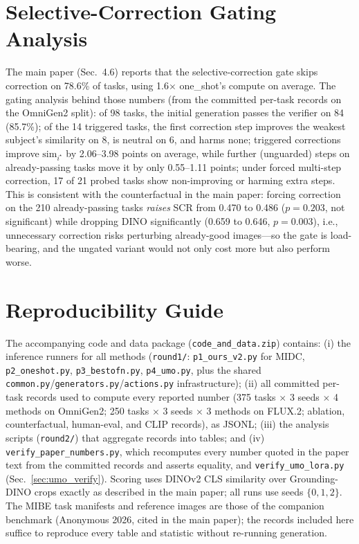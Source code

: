 \documentclass[letterpaper]{article}
\begin{document}
\section{Selective-Correction Gating Analysis}
\label{sec:gating}

The main paper (Sec.~4.6) reports that the selective-correction gate skips correction on 78.6\% of tasks, using 1.6$\times$ one\_shot's compute on average. The gating analysis behind those numbers (from the committed per-task records on the OmniGen2 split): of 98 tasks, the initial generation passes the verifier on 84 (85.7\%); of the 14 triggered tasks, the first correction step improves the weakest subject's similarity on 8, is neutral on 6, and harms none; triggered corrections improve $\mathrm{sim}_{i^\star}$ by 2.06--3.98 points on average, while further (unguarded) steps on already-passing tasks move it by only 0.55--1.11 points; under forced multi-step correction, 17 of 21 probed tasks show non-improving or harming extra steps. This is consistent with the counterfactual in the main paper: forcing correction on the 210 already-passing tasks \emph{raises} SCR from 0.470 to 0.486 ($p{=}0.203$, not significant) while dropping DINO significantly (0.659 to 0.646, $p{=}0.003$), i.e., unnecessary correction risks perturbing already-good images---so the gate is load-bearing, and the ungated variant would not only cost more but also perform worse.

\section{Reproducibility Guide}
\label{sec:repro}

The accompanying code and data package (\texttt{code\_and\_data.zip}) contains: (i) the inference runners for all methods (\texttt{round1/}: \texttt{p1\_ours\_v2.py} for MIDC, \texttt{p2\_oneshot.py}, \texttt{p3\_bestofn.py}, \texttt{p4\_umo.py}, plus the shared \texttt{common.py}/\texttt{generators.py}/\texttt{actions.py} infrastructure); (ii) all committed per-task records used to compute every reported number (375 tasks $\times$ 3 seeds $\times$ 4 methods on OmniGen2; 250 tasks $\times$ 3 seeds $\times$ 3 methods on FLUX.2; ablation, counterfactual, human-eval, and CLIP records), as JSONL; (iii) the analysis scripts (\texttt{round2/}) that aggregate records into tables; and (iv) \texttt{verify\_paper\_numbers.py}, which recomputes every number quoted in the paper text from the committed records and asserts equality, and \texttt{verify\_umo\_lora.py} (Sec.~\ref{sec:umo_verify}). Scoring uses DINOv2 CLS similarity over Grounding-DINO crops exactly as described in the main paper; all runs use seeds $\{0, 1, 2\}$. The MIBE task manifests and reference images are those of the companion benchmark (Anonymous 2026, cited in the main paper); the records included here suffice to reproduce every table and statistic without re-running generation.
\end{document}
